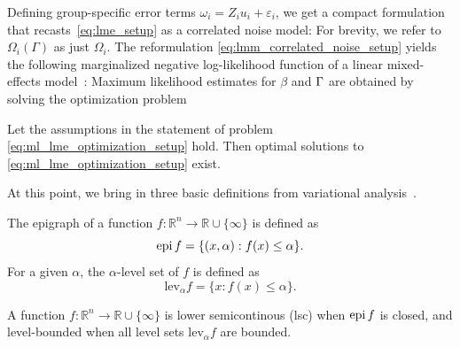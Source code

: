 Defining group-specific error terms $\omega_i = Z_i u_i + \varepsilon_i$, we get a compact formulation that 
recasts~\eqref{eq:lme_setup} as a correlated noise model:
For brevity, we refer to $\Omega_i(\Gamma)$ as just $\Omega_i$.
The reformulation \eqref{eq:lmm_correlated_noise_setup}
yields the following marginalized  negative log-likelihood function of a linear mixed-effects model~\citep{Patterson1971}:
Maximum likelihood estimates for $\beta$ and $\Gamma$ are obtained by
solving the optimization problem

\begin{theorem}\label{thm:basic existence}
Let the assumptions in the statement of problem \eqref{eq:ml_lme_optimization_setup} hold. Then optimal solutions to
\eqref{eq:ml_lme_optimization_setup} exist.
\end{theorem}

At this point, we bring in three basic definitions from variational analysis~\cite{rockafellar2009variational}. 

\begin{definition}
The epigraph of a function $f:\mathbb{R}^n\rightarrow \mathbb{R} \cup \{\infty\}$ is defined as
\[
\operatorname{epi} f = \{(x,\alpha) : f(x) \leq \alpha\}. 
\]
For a given $\alpha$, the $\alpha$-level set of $f$ is defined as
\[
\text{lev}_\alpha f = \{x: f(x) \leq \alpha\}.
\] 
\end{definition}

\begin{definition}
A function $f:\mathbb{R}^n\rightarrow \mathbb{R} \cup \{\infty\}$ is lower semicontinous (lsc) when $\operatorname{epi} f$ is closed, 
and level-bounded when all level sets $\text{lev}_\alpha f$ are bounded.  
\end{definition}


